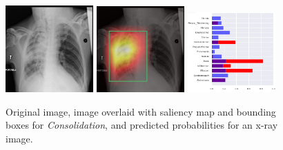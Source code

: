 \documentclass[8pt]{beamer}
\begin{document}
\begin{frame}
\begin{figure}[H]
  \centering
  \includegraphics[width=0.3\textwidth]{images/preds/consolidation}\hspace{0.01\textwidth}%
  \includegraphics[width=0.3\textwidth]{images/preds/consolidation_cam}\hspace{0.01\textwidth}%
  \includegraphics[width=0.3\textwidth]{images/preds/consolidation_probs}\\[0.01\textwidth]
  \caption{Original image, image overlaid with saliency map and bounding boxes
    for \emph{Consolidation}, and predicted probabilities for an x-ray image.}
  \label{examples_9}
\end{figure}
\end{frame}
\end{document}
